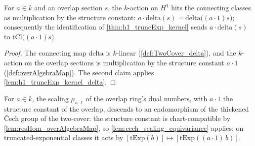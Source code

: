 \begin{lemma}
  \label{lem:smul_delta}
  \leanok
  For \(a \in k\) and an overlap section \(s\), the \(k\)-action on \(H^1\) hits the
  connecting classes as multiplication by the structure constant:
  \(a \cdot \mathrm{delta}(s) = \mathrm{delta}\bigl((a \cdot 1) s\bigr)\); consequently
  the identification of \ref{thm:h1_truncExp_kernel} sends
  \(a \cdot \mathrm{delta}(s)\) to \(\mathrm{tCl}\bigl((a \cdot 1) s\bigr)\).
\end{lemma}
\begin{proof}
  \leanok
  The connecting map \(\mathrm{delta}\) is \(k\)-linear
  (\ref{def:TwoCover_delta}), and the \(k\)-action on the overlap sections is
  multiplication by the structure constant \(a \cdot 1\)
  (\ref{def:overAlgebraMap}). The second claim applies
  \ref{lem:h1_truncExp_kernel_delta}.
\end{proof}

\begin{definition}
  \label{def:twoCover_mumfordScaling}
  \leanok
  For \(a \in k\), the scaling \(\mu_{a \cdot 1}\) of the overlap ring's dual numbers,
  with \(a \cdot 1\) the structure constant of the overlap, descends to an endomorphism
  of the thickened \v{C}ech group of the two-cover: the structure constant is
  chart-compatible by \ref{lem:resHom_overAlgebraMap}, so
  \ref{lem:cech_scaling_equivariance} applies; on truncated-exponential classes it acts
  by \([\mathrm{tExp}(b)] \mapsto [\mathrm{tExp}((a \cdot 1)\, b)]\).
\end{definition}

